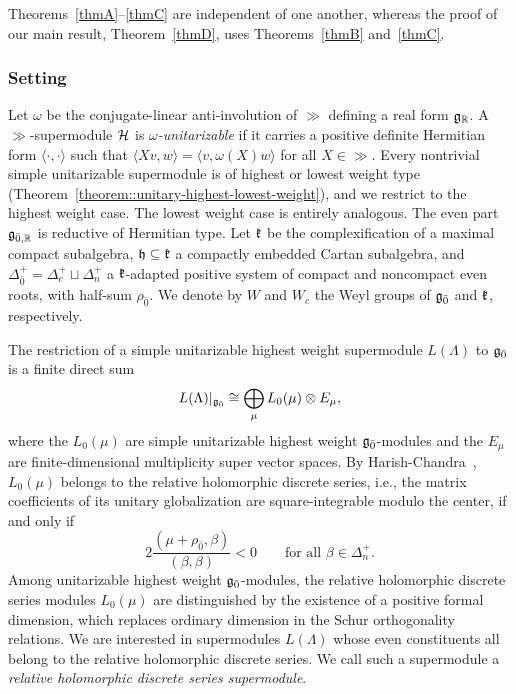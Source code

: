 Theorems~\ref{thmA}--\ref{thmC} are independent of one another, whereas the proof of our main result, Theorem~\ref{thmD}, uses Theorems~\ref{thmB} and~\ref{thmC}.

\subsubsection*{Setting}
Let $\omega$ be the conjugate-linear anti-involution of $\gg$ defining a real form ${\mathfrak{g}}_{{\mathbb R}}$. A $\gg$-supermodule ${\mathcal{H}}$ is \emph{$\omega$-unitarizable} if it carries a positive definite Hermitian form $\langle\cdot,\cdot\rangle$ such that $\langle Xv,w\rangle=\langle v,\omega(X)w\rangle$ for all $X\in\gg$. Every nontrivial simple unitarizable supermodule is of highest or lowest weight type (Theorem~\ref{theorem::unitary-highest-lowest-weight}), and we restrict to the highest weight case. The lowest weight case is entirely analogous. The even part ${\mathfrak{g}}_{\bar0,{\mathbb R}}$ is reductive of Hermitian type. Let ${\mathfrak k}$ be the complexification of a maximal compact subalgebra, ${\mathfrak h}\subseteq{\mathfrak k}$ a compactly embedded Cartan subalgebra, and $\Delta_{\bar0}^+=\Delta_c^+\sqcup\Delta_n^+$ a ${\mathfrak k}$-adapted positive system of compact and noncompact even roots, with half-sum $\rho_{\bar0}$. We denote by $W$ and $W_{c}$ the Weyl groups of ${\mathfrak{g}_{\bar{0}}}$ and ${\mathfrak k}$, respectively.

The restriction of a simple unitarizable highest weight supermodule $L(\Lambda)$ to ${\mathfrak{g}_{\bar{0}}}$ is a finite direct sum
\begin{equation}\label{eq::intro_branching}
L(\Lambda)\vert_{{\mathfrak{g}_{\bar{0}}}}
\cong
\bigoplus_\mu L_0(\mu)\otimes E_\mu,
\end{equation}
where the $L_0(\mu)$ are simple unitarizable highest weight ${\mathfrak{g}_{\bar{0}}}$-modules and the $E_\mu$ are finite-dimensional multiplicity super vector spaces. By Harish-Chandra~\cite{HC_VI}, $L_0(\mu)$ belongs to the relative holomorphic discrete series, i.e., the matrix coefficients of its unitary globalization are square-integrable modulo the center, if and only if
\begin{equation}
2\frac{(\mu+\rho_{\bar0},\beta)}{(\beta,\beta)}<0
\qquad\text{for all }\beta\in\Delta_n^+.
\end{equation}
Among unitarizable highest weight ${\mathfrak{g}_{\bar{0}}}$-modules, the relative holomorphic discrete series modules $L_0(\mu)$ are distinguished by the existence of a positive formal dimension, which replaces ordinary dimension in the Schur orthogonality relations. 
We are interested in supermodules $L(\Lambda)$ whose even constituents all belong to the relative holomorphic discrete series. We call such a supermodule a \emph{relative holomorphic discrete series supermodule}.

